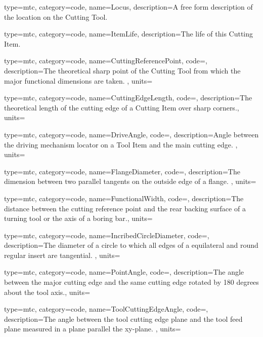{
  type=mtc,
  category=code,
  name={Locus},
  description={A free form description of the location on the Cutting Tool.}
}


{
  type=mtc,
  category=code,
  name={ItemLife},
  description={The life of this Cutting Item.}
}


{
  type=mtc,
  category=code,
  name={CuttingReferencePoint},
  code=,
  description={The theoretical sharp point of the Cutting Tool from which the major functional dimensions are taken. },
  units=
}


{
  type=mtc,
  category=code,
  name={CuttingEdgeLength},
  code=,
  description={The theoretical length of the cutting edge of a Cutting Item over sharp corners.},
  units=
}


{
  type=mtc,
  category=code,
  name={DriveAngle},
  code=,
  description={Angle between the driving mechanism locator on a Tool Item and the main cutting edge. },
  units=
}


{
  type=mtc,
  category=code,
  name={FlangeDiameter},
  code=,
  description={The dimension between two parallel tangents on the outside edge of a flange. },
  units=
}


{
  type=mtc,
  category=code,
  name={FunctionalWidth},
  code=,
  description={The distance between the cutting reference point and the rear backing surface of a turning tool or the axis of a boring bar.},
  units=
}


{
  type=mtc,
  category=code,
  name={IncribedCircleDiameter},
  code=,
  description={The diameter of a circle to which all edges of a equilateral and round regular insert are tangential. },
  units=
}


{
  type=mtc,
  category=code,
  name={PointAngle},
  code=,
  description={The angle between the major cutting edge and the same cutting edge rotated by 180 degrees about the tool axis.},
  units=
}


{
  type=mtc,
  category=code,
  name={ToolCuttingEdgeAngle},
  code=,
  description={The angle between the tool cutting edge plane and the tool feed plane measured in a plane parallel the xy-plane. },
  units=
}


